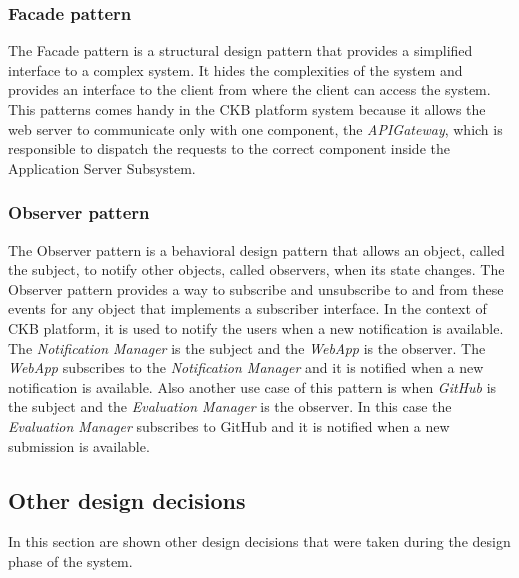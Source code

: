 \subsubsection{Facade pattern}
The Facade pattern is a structural design pattern that provides a simplified interface to a complex system. It hides the complexities of the system and provides an interface to the client from where the client can access the system.
This patterns comes handy in the CKB platform system because it allows the web server to communicate only with one component, the \textit{APIGateway}, which is responsible to dispatch the requests to the correct component inside the Application Server Subsystem.
\subsubsection{Observer pattern}
The Observer pattern is a behavioral design pattern that allows an object, called the subject, to notify other objects, called observers, when its state changes. The Observer pattern provides a way to subscribe and unsubscribe to and from these events for any object that implements a subscriber interface. In the context of CKB platform, it is used to notify the users when a new notification is available. The \textit{Notification Manager} is the subject and the \textit{WebApp} is the observer. The \textit{WebApp} subscribes to the \textit{Notification Manager} and it is notified when a new notification is available. Also another use case of this pattern is when \textit{GitHub} is the subject and the \textit{Evaluation Manager} is the observer. In this case the \textit{Evaluation Manager} subscribes to GitHub and it is notified when a new submission is available.
\subsection{Other design decisions}
In this section are shown other design decisions that were taken during the design phase of the system.
